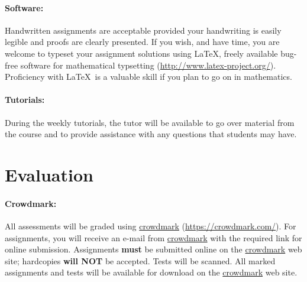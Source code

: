 \documentclass[12pt]{article}
\begin{document}
\paragraph*{Software:} Handwritten assignments are acceptable provided your handwriting is easily legible and proofs are clearly presented.  If you wish, and have time, you are welcome to typeset your assignment solutions using \LaTeX, freely available bug-free software for mathematical typsetting (\url{http://www.latex-project.org/}).  Proficiency with \LaTeX\ is a valuable skill if you plan to go on in mathematics.

\paragraph*{Tutorials:} During the weekly tutorials, the tutor will be available to go over material from the course and to provide assistance with any questions that students may have.

\section*{Evaluation}

\paragraph*{Crowdmark:} All assessments will be graded using
\href{https://crowdmark.com/}{crowdmark}
(\url{https://crowdmark.com/}).  For assignments, you will receive an
e-mail from \href{https://crowdmark.com/}{crowdmark} with the required
link for online submission.  Assignments \textbf{must} be submitted
online on the \href{https://crowdmark.com/}{crowdmark} web site;
hardcopies \textbf{will NOT} be accepted.  Tests will be scanned.  All
marked assignments and tests will be available for download on the
\href{https://crowdmark.com/}{crowdmark} web site.
\end{document}

